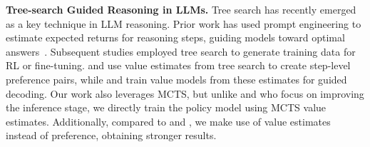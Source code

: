 \textbf{Tree-search Guided Reasoning in LLMs.} Tree search has recently emerged as a key technique in LLM reasoning. Prior work has used prompt engineering to estimate expected returns for reasoning steps, guiding models toward optimal answers~\citep{yao2024tree,feng2023alphazero,besta2024graph}. Subsequent studies employed tree search to generate training data for RL or fine-tuning. \citet{xie2024monte} and \citet{chen2024step} use value estimates from tree search to create step-level preference pairs, while \citet{feng2023alphazero} and \citet{chen2024alphamath} train value models from these estimates for guided decoding. Our work also leverages MCTS, but unlike \citet{feng2023alphazero} and \citet{chen2024alphamath} who focus on improving the inference stage, we directly train the policy model using MCTS value estimates. Additionally, compared to \citet{xie2024monte} and \citet{chen2024step}, we make use of value estimates instead of preference, obtaining stronger results.